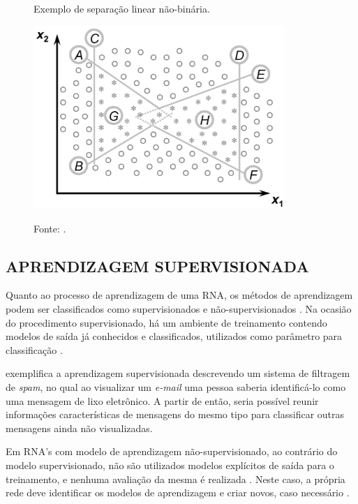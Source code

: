 \begin{figure}[H]
	\caption{Exemplo de separação linear não-binária.}
	\centering %
	\includegraphics[width=9.5cm]{resources/multilayer_perceptron.png} %
	\label{figura:multilayer_perceptron}
	\captionsetup{singlelinecheck = false, format= hang, justification=raggedright, labelsep=space, width=9.5cm}
	\caption*{\footnotesize Fonte: .}
\end{figure}

\subsection{APRENDIZAGEM SUPERVISIONADA}

Quanto ao processo de aprendizagem de uma RNA, os métodos de aprendizagem podem ser classificados como supervisionados e não-supervisionados \cite{haykin2007redes}. Na ocasião do procedimento supervisionado, há um ambiente de treinamento contendo modelos de saída já conhecidos e classificados, utilizados como parâmetro para classificação \cite{marius2009}.

 exemplifica a aprendizagem supervisionada descrevendo um sistema de filtragem de \textit{spam}, no qual ao visualizar um \textit{e-mail} uma pessoa saberia identificá-lo como uma mensagem de lixo eletrônico. A partir de então, seria possível reunir informações características de mensagens do mesmo tipo para classificar outras mensagens ainda não visualizadas.

Em RNA's com modelo de aprendizagem não-supervisionado, ao contrário do modelo supervisionado, não são utilizados modelos explícitos de saída para o treinamento, e nenhuma avaliação da mesma é realizada \cite{von2005rede}. Neste caso, a própria rede deve identificar os modelos de aprendizagem e criar novos, caso necessário \cite{becker1991}.

